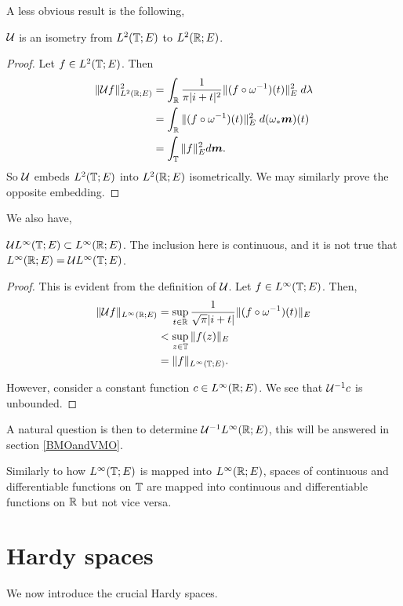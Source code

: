 \documentclass{unswmaths}
\begin{document}
A less obvious result is the following, 
\begin{theorem}
    $\mathcal{U}$ is an isometry from $L^2(\mathbb{T};E)$ to $L^2(\mathbb{R};E)$. 
\end{theorem}
\begin{proof}
    Let $f \in L^2(\mathbb{T};E)$. Then
    \begin{align*}
        \|\mathcal{U} f\|_{L^2(\mathbb{R};E)}^2 &= \int_{\mathbb{R}} \frac{1}{\pi|i+t|^2}\|(f\circ\omega^{-1})(t)\|_E^2\;d\lambda\\
        &= \int_{\mathbb{R}} \|(f\circ\omega^{-1})(t)\|_E^2\;d(\omega_*\boldsymbol{m})(t)\\
        &= \int_{\mathbb{T}} \|f\|_E^2 d\boldsymbol{m}.
    \end{align*}
    So $\mathcal{U}$ embeds $L^2(\mathbb{T};E)$ into $L^2(\mathbb{R};E)$ isometrically.
    We may similarly prove the opposite embedding.
\end{proof}


We also have,
\begin{theorem}
    $\mathcal{U} L^\infty(\mathbb{T};E) \subset L^\infty(\mathbb{R};E)$. The inclusion
    here is continuous, and it is not true that $L^\infty(\mathbb{R};E) = \mathcal{U} L^\infty(\mathbb{T};E)$.
\end{theorem}
\begin{proof}
    This is evident from the definition of $\mathcal{U}$. Let $f \in L^\infty(\mathbb{T};E)$. Then,
    \begin{align*}
        \|\mathcal{U} f\|_{L^\infty(\mathbb{R};E)} &= \sup_{t \in \mathbb{R}} \frac{1}{\sqrt{\pi}|i+t|}\|(f\circ \omega^{-1})(t)\|_{E} \\
        &< \sup_{z \in \mathbb{T}} \|f(z)\|_E\\
        &= \|f\|_{L^\infty(\mathbb{T};E)}.
    \end{align*}
    
    However, consider a constant function $c \in L^\infty(\mathbb{R};E)$.
    We see that $\mathcal{U}^{-1}c$ is unbounded.
\end{proof}

A natural question is then to determine $\mathcal{U}^{-1}L^\infty(\mathbb{R};E)$, this will
be answered in section \ref{BMOandVMO}.

Similarly to how $L^\infty(\mathbb{T};E)$ is mapped into $L^\infty(\mathbb{R};E)$, spaces
of continuous and differentiable functions on $\mathbb{T}$ are mapped into
continuous and differentiable functions on $\mathbb{R}$ but not vice versa.


\section*{Hardy spaces}
We now introduce the crucial Hardy spaces.
\end{document}
